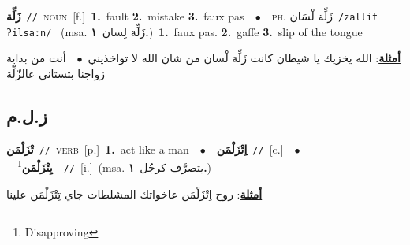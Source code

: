 \documentclass[10pt,a4paper,twoside]{article} %
\begin{document}
\begin{multicols}{2}
{\setlength\topsep{0pt}\textbf{\foreignlanguage{arabic}{زَلِّة}}\ {\color{gray}\texttt{//}\color{black}}\ \textsc{noun}\ [f.]\ \textbf{1.}~fault  \textbf{2.}~mistake  \textbf{3.}~faux pas\ \ $\bullet$\ \ \textsc{ph.} \color{gray} \foreignlanguage{arabic}{زَلِّة لْسَان}\color{black}\ {\color{gray}\texttt{/{\sffamily zallit ʔilsaːn}/}\color{black}}\ \color{gray} (msa. \foreignlanguage{arabic}{زَلِّة لِسان}~\foreignlanguage{arabic}{\textbf{١.}})\color{black}\ \textbf{1.}~faux pas.  \textbf{2.}~gaffe  \textbf{3.}~slip of the tongue\  \begin{flushright}\color{gray}\foreignlanguage{arabic}{\textbf{\underline{\foreignlanguage{arabic}{أمثلة}}}: الله يخزيك يا شيطان كانت زَلِّة لْسان من شان الله لا تواخذيني\ $\bullet$\ \  أنت من بداية زواجنا بتستاني عالزّلِّة}\end{flushright}\color{black}} \vspace{2mm}

\vspace{-3mm}
\subsection*{\color{blue}\foreignlanguage{arabic}{ز.ل.م}\color{blue}{}} 

{\setlength\topsep{0pt}\textbf{\foreignlanguage{arabic}{تْزَلْمَن}}\ {\color{gray}\texttt{//}\color{black}}\ \textsc{verb}\ [p.]\ \textbf{1.}~act like a man\ \ $\bullet$\ \ \setlength\topsep{0pt}\textbf{\foreignlanguage{arabic}{اِتْزَلْمَن}}\ {\color{gray}\texttt{//}\color{black}}\ [c.]\ \ $\bullet$\ \ \setlength\topsep{0pt}\textbf{\foreignlanguage{arabic}{يِتْزَلْمَن}}\footnote{Disapproving}\ \ {\color{gray}\texttt{//}\color{black}}\ [i.]\ \color{gray}(msa. \foreignlanguage{arabic}{يتصرَّف كرجُل}~\foreignlanguage{arabic}{\textbf{١.}})\color{black}\  \begin{flushright}\color{gray}\foreignlanguage{arabic}{\textbf{\underline{\foreignlanguage{arabic}{أمثلة}}}: روح اِتْزَلْمَن عاخواتك المشلطات جاي تِتْزَلْمَن علينا}\end{flushright}\color{black}} \vspace{2mm}


\end{multicols}
\end{document}
